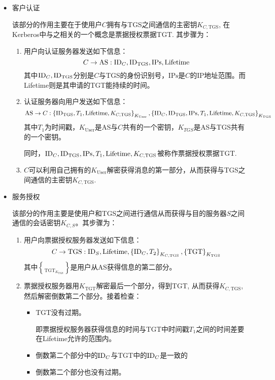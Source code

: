 \begin{itemize}
	\item 客户认证\par
	该部分的作用主要在于使用户$C$拥有与TGS之间通信的主密钥$K_{C, \mathrm{TGS}}$, 在Kerberos中与之相关的一个概念是票据授权票据TGT. 其步骤为：
	\begin{enumerate}
		\item 用户向认证服务器发送如下信息：
		\[C\to\mathrm{AS}: \mathrm{ID}_C, \mathrm{ID}_{\mathrm{TGS}}, \mathrm{IPs}, \mathrm{Lifetime}\]
		其中$\mathrm{ID}_C, \mathrm{ID}_{\mathrm{TGS}}$分别是$C$与TGS的身份识别号，$\mathrm{IPs}$是$C$的IP地址范围。而Lifetime则是其申请的TGT能持续的时间。
		\item 认证服务器向用户发送如下信息：
		\[\mathrm{AS}\to C: \left\{ {\mathrm{ID}_{\mathrm{TGS}}, T_1, \mathrm{Lifetime}, K_{C, \mathrm{TGS}}} \right\}_{K_{\mathrm{User}}}, \left\{ {\mathrm{ID}_C, \mathrm{ID}_{\mathrm{TGS}}, \mathrm{IPs}, T_1, \mathrm{Lifetime}, K_{C, \mathrm{TGS}}} \right\}_{K_{\mathrm{TGS}}}\]
		其中$T_1$为时间戳，$K_{\mathrm{User}}$是AS与$C$共有的一个密钥，$K_{TGS}$是AS与TGS共有的一个密钥。\par
		同时，$\mathrm{ID}_C, \mathrm{ID}_{\mathrm{TGS}}, \mathrm{IPs}, T_1, \mathrm{Lifetime}, K_{C, \mathrm{TGS}}$被称作票据授权票据TGT.
		\item $C$可以利用自己拥有的$K_{\mathrm{User}}$解密获得消息的第一部分，从而获得与TGS之间通信的主密钥$K_{C, \mathrm{TGS}}$.
	\end{enumerate}
	\item 服务授权\par
	该部分的作用主要是使用户和TGS之间进行通信从而获得与目的服务器$S$之间通信的会话密钥$K_{C, S}$。其步骤为：
	\begin{enumerate}
		\item 用户向票据授权服务器发送如下信息：
		\[C\to\mathrm{TGS}: \mathrm{ID}_{S}, \mathrm{Lifetime}, \left\{ {\mathrm{ID}_C, T_2} \right\}_{K_{C, \mathrm{TGS}}}, \left\{ {\mathrm{TGT}} \right\}_{K_{\mathrm{TGS}}}\]
		其中$\brace{\mathrm{TGT}}_{K_{\mathrm{TGS}}}$是用户从AS获得信息的第二部分。
		\item 票据授权服务器用$K_{\mathrm{TGT}}$解密最后一个部分，得到TGT, 从而获得$K_{C, \mathrm{TGS}}$, 然后解密倒数第二个部分。接着检查：
		\begin{itemize}
			\item TGT没有过期。\par
			即票据授权服务器获得信息的时间与TGT中时间戳$T_1$之间的时间差要在Lifetime允许的范围内。
			\item 倒数第二个部分中的$\mathrm{ID}_{C}$与TGT中的$\mathrm{ID}_C$是一致的
			\item 倒数第二个部分也没有过期。\par

\end{itemize}
\end{enumerate}
\end{itemize}
